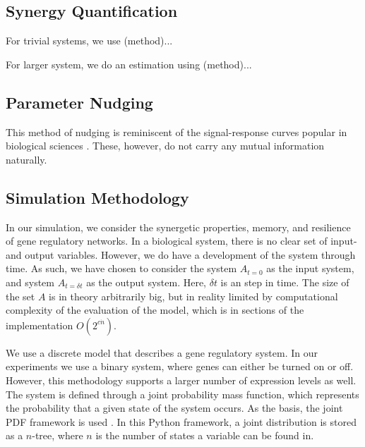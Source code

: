 \documentclass[../main.tex]{subfiles}
\begin{document}
\subsection{Synergy Quantification}

For trivial systems, we use (method)...

For larger system, we do an estimation using (method)...

\subsection{Parameter Nudging}


This method of nudging is reminiscent of the signal-response curves popular in biological sciences \cite{tyson2010functional}.
These, however, do not carry any mutual information naturally.

\subsection{Simulation Methodology}

In our simulation, we consider the synergetic properties, memory, and resilience of gene regulatory networks.
In a biological system, there is no clear set of input- and output variables.
However, we do have a development of the system through time.
As such, we have chosen to consider the system $A_{t=0}$ as the input system, and system $A_{t=\delta t}$ as the output system.
Here, $\delta t$ is an step in time. %
The size of the set $A$ is in theory arbitrarily big, but in reality limited by computational complexity of the evaluation of the model, which is in sections of the implementation $O(2^{c \dot n})$.

We use a discrete model that describes a gene regulatory system.
In our experiments we use a binary system, where genes can either be turned on or off.
However, this methodology supports a larger number of expression levels as well.
The system is defined through a joint probability mass function, which represents the probability that a given state of the system occurs.
As the basis, the joint PDF framework is used \cite{jointpdf}.
In this Python framework, a joint distribution is stored as a $n$-tree, where $n$ is the number of states a variable can be found in.
\end{document}
